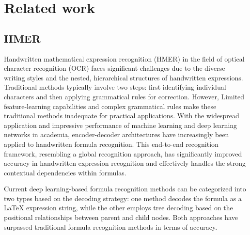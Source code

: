 \section{Related work}
\label{sec2}
\subsection{HMER} \label{sec2.1}
Handwritten mathematical expression recognition (HMER) in the field of optical character recognition (OCR) faces significant challenges due to the diverse writing styles and the nested, hierarchical structures of handwritten expressions. Traditional methods\cite{chan1998elastic, hu2011hmm, keshari2007hybrid, kosmala1999line, vuong2010towards, winkler1996hmm} typically involve two steps: first identifying individual characters and then applying grammatical rules for correction. However, Limited feature-learning capabilities and complex grammatical rules make these traditional methods inadequate for practical applications. With the widespread application and impressive performance of machine learning and deep learning networks in academia, encoder-decoder architectures have increasingly been applied to handwritten formula recognition. This end-to-end recognition framework, resembling a global recognition approach, has significantly improved accuracy in handwritten expression recognition and effectively handles the strong contextual dependencies within formulas. 

Current deep learning-based formula recognition methods can be categorized into two types based on the decoding strategy: one method decodes the formula as a LaTeX expression string, while the other employs tree decoding based on the positional relationships between parent and child nodes. Both approaches have surpassed traditional formula recognition methods in terms of accuracy.

